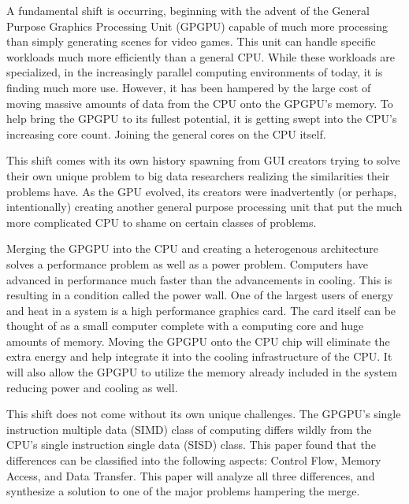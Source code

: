 A fundamental shift is occurring, beginning with the advent of the General Purpose Graphics Processing Unit (GPGPU) capable of much more processing than simply generating scenes for video games. This unit can handle specific workloads much more efficiently than a general CPU. While these workloads are specialized, in the increasingly parallel computing environments of today, it is finding much more use. However, it has been hampered by the large cost of moving massive amounts of data from the CPU onto the GPGPU's memory. To help bring the GPGPU to its fullest potential, it is getting swept into the CPU's increasing core count. Joining the general cores on the CPU itself. 

This shift comes with its own history spawning from GUI creators trying to solve their own unique problem to big data researchers realizing the similarities their problems have. As the GPU evolved, its creators were inadvertently (or perhaps, intentionally) creating another general purpose processing unit that put the much more complicated CPU to shame on certain classes of problems. 

Merging the GPGPU into the CPU and creating a heterogenous architecture solves a performance problem as well as a power problem. Computers have advanced in performance much faster than the advancements in cooling. This is resulting in a condition called the power wall. One of the largest users of energy and heat in a system is a high performance graphics card. The card itself can be thought of as a small computer complete with a computing core and huge amounts of memory. Moving the GPGPU onto the CPU chip will eliminate the extra energy and help integrate it into the cooling infrastructure of the CPU. It will also allow the GPGPU to utilize the memory already included in the system reducing power and cooling as well.

This shift does not come without its own unique challenges. The GPGPU's single instruction multiple data (SIMD) class of computing differs wildly from the CPU's single instruction single data (SISD) class. This paper found that the differences can be classified into the following aspects: Control Flow, Memory Access, and Data Transfer. This paper will analyze all three differences, and synthesize a solution to one of the major problems hampering the merge.

